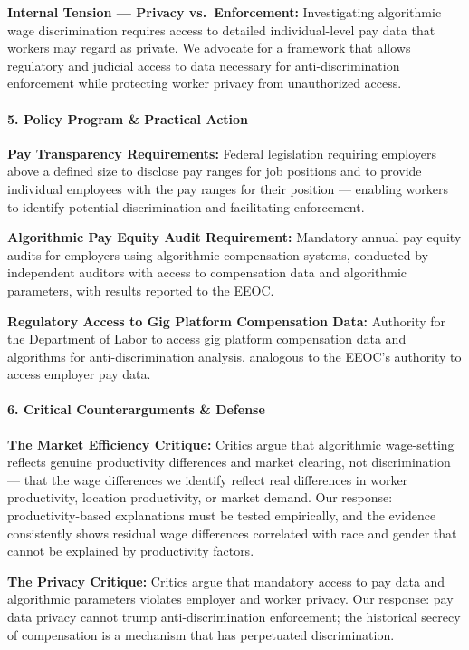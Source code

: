\textbf{Internal Tension --- Privacy vs.~Enforcement:} Investigating
algorithmic wage discrimination requires access to detailed
individual-level pay data that workers may regard as private. We
advocate for a framework that allows regulatory and judicial access to
data necessary for anti-discrimination enforcement while protecting
worker privacy from unauthorized access.

\paragraph{5. Policy Program \& Practical
Action}\label{policy-program-practical-action-42}

\textbf{Pay Transparency Requirements:} Federal legislation requiring
employers above a defined size to disclose pay ranges for job positions
and to provide individual employees with the pay ranges for their
position --- enabling workers to identify potential discrimination and
facilitating enforcement.

\textbf{Algorithmic Pay Equity Audit Requirement:} Mandatory annual pay
equity audits for employers using algorithmic compensation systems,
conducted by independent auditors with access to compensation data and
algorithmic parameters, with results reported to the EEOC.

\textbf{Regulatory Access to Gig Platform Compensation Data:} Authority
for the Department of Labor to access gig platform compensation data and
algorithms for anti-discrimination analysis, analogous to the EEOC's
authority to access employer pay data.

\paragraph{6. Critical Counterarguments \&
Defense}\label{critical-counterarguments-defense-42}

\textbf{The Market Efficiency Critique:} Critics argue that algorithmic
wage-setting reflects genuine productivity differences and market
clearing, not discrimination --- that the wage differences we identify
reflect real differences in worker productivity, location productivity,
or market demand. Our response: productivity-based explanations must be
tested empirically, and the evidence consistently shows residual wage
differences correlated with race and gender that cannot be explained by
productivity factors.

\textbf{The Privacy Critique:} Critics argue that mandatory access to
pay data and algorithmic parameters violates employer and worker
privacy. Our response: pay data privacy cannot trump anti-discrimination
enforcement; the historical secrecy of compensation is a mechanism that
has perpetuated discrimination.

